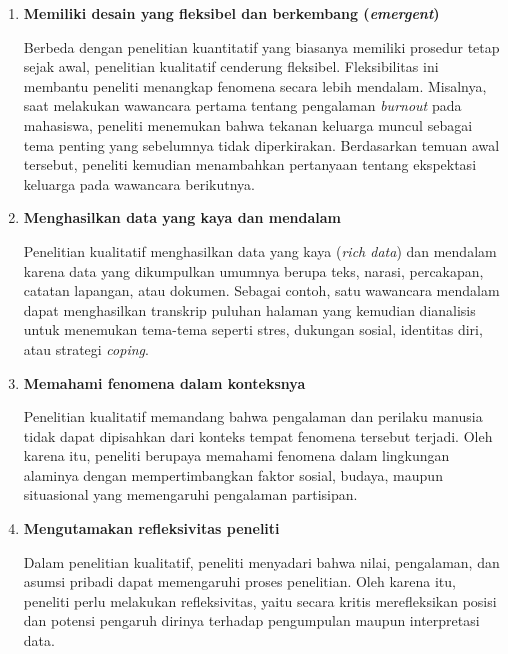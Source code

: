 \documentclass[
  indonesian,
  letterpaper,
  DIV=11,
  numbers=noendperiod]{scrreprt}
\begin{document}
\begin{enumerate}
  Penelitian kualitatif umumnya menggunakan penalaran induktif, yaitu
  membangun tema, kategori, dan pola berdasarkan data lapangan. Peneliti
  menafsirkan data secara bertahap hingga memperoleh pemahaman yang
  lebih utuh tentang fenomena yang diteliti. Meskipun demikian, peneliti
  juga menggunakan penalaran deduktif untuk meninjau kembali data dan
  memastikan bahwa tema yang ditemukan didukung oleh bukti yang memadai.
  Karena itu, analisis kualitatif memadukan penalaran induktif dan
  deduktif secara berkelanjutan.
\item
  \textbf{Memiliki desain yang fleksibel dan berkembang
  (\emph{emergent})}

  Berbeda dengan penelitian kuantitatif yang biasanya memiliki prosedur
  tetap sejak awal, penelitian kualitatif cenderung fleksibel.
  Fleksibilitas ini membantu peneliti menangkap fenomena secara lebih
  mendalam. Misalnya, saat melakukan wawancara pertama tentang
  pengalaman \emph{burnout} pada mahasiswa, peneliti menemukan bahwa
  tekanan keluarga muncul sebagai tema penting yang sebelumnya tidak
  diperkirakan. Berdasarkan temuan awal tersebut, peneliti kemudian
  menambahkan pertanyaan tentang ekspektasi keluarga pada wawancara
  berikutnya.
\item
  \textbf{Menghasilkan data yang kaya dan mendalam}

  Penelitian kualitatif menghasilkan data yang kaya (\emph{rich data})
  dan mendalam karena data yang dikumpulkan umumnya berupa teks, narasi,
  percakapan, catatan lapangan, atau dokumen. Sebagai contoh, satu
  wawancara mendalam dapat menghasilkan transkrip puluhan halaman yang
  kemudian dianalisis untuk menemukan tema-tema seperti stres, dukungan
  sosial, identitas diri, atau strategi \emph{coping}.
\item
  \textbf{Memahami fenomena dalam konteksnya}

  Penelitian kualitatif memandang bahwa pengalaman dan perilaku manusia
  tidak dapat dipisahkan dari konteks tempat fenomena tersebut terjadi.
  Oleh karena itu, peneliti berupaya memahami fenomena dalam lingkungan
  alaminya dengan mempertimbangkan faktor sosial, budaya, maupun
  situasional yang memengaruhi pengalaman partisipan.
\item
  \textbf{Mengutamakan refleksivitas peneliti}

  Dalam penelitian kualitatif, peneliti menyadari bahwa nilai,
  pengalaman, dan asumsi pribadi dapat memengaruhi proses penelitian.
  Oleh karena itu, peneliti perlu melakukan refleksivitas, yaitu secara
  kritis merefleksikan posisi dan potensi pengaruh dirinya terhadap
  pengumpulan maupun interpretasi data.
\end{enumerate}
\end{document}
